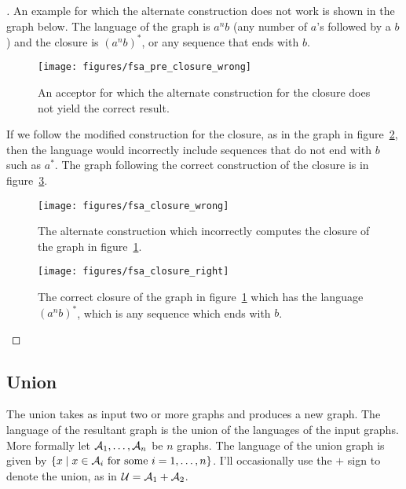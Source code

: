 \documentclass[main.tex]{subfiles}
\begin{document}
\begin{proof}[\unskip\nopunct]
An example for which the alternate construction does not work is shown in the
graph below. The language of the graph is $a^nb$ (any number of $a$'s followed
by a $b$) and the closure is $(a^nb)^*$, or any sequence that ends with $b$.

\begin{figure}
    \centering
    \texttt{[image: figures/fsa\_pre\_closure\_wrong]}
    \caption{An acceptor for which the alternate construction for the closure
    does not yield the correct result.}
    \label{fig:fsa_pre_closure_wrong}
\end{figure}

If we follow the modified construction for the closure, as in the graph in
figure~\ref{fig:fsa_closure_wrong}, then the language would incorrectly
include sequences that do not end with $b$ such as $a^*$. The graph
following the correct construction of the closure is in
figure~\ref{fig:fsa_closure_right}.

\begin{figure}
    \centering
    \texttt{[image: figures/fsa\_closure\_wrong]}
    \caption{The alternate construction which incorrectly computes the closure
    of the graph in figure~\ref{fig:fsa_pre_closure_wrong}.}
    \label{fig:fsa_closure_wrong}
\end{figure}


\begin{figure}
    \centering
    \texttt{[image: figures/fsa\_closure\_right]}
    \caption{The correct closure of the graph in
    figure~\ref{fig:fsa_pre_closure_wrong} which has the language $(a^nb)^*$, which
    is any sequence which ends with $b$.}
    \label{fig:fsa_closure_right}
\end{figure}

\end{proof}

\subsection{Union}

The union takes as input two or more graphs and produces a new graph. The
language of the resultant graph is the union of the languages of the input
graphs. More formally let $\mathcal{A}_1, \ldots, \mathcal{A}_n$ be $n$ graphs. The language of
the union graph is given by $\{ x \mid x \in \mathcal{A}_i \textrm{ for some } i = 1,
\ldots, n \}$. I'll occasionally use the $+$ sign to denote the union, as in
$\mathcal{U} = \mathcal{A}_1 + \mathcal{A}_2$.
\end{document}
